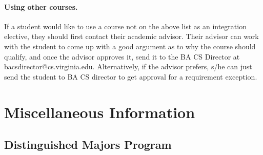 \documentclass[10pt,letter]{book}
\makeatletter
\newenvironment{numlist}{
\begin{enumerate}
\setlength{\itemsep}{0pt}
\setlength{\parskip}{0pt}}
{\end{enumerate}}
\newcommand{\bacsdirectoremail}{bacsdirector@cs.virginia.edu}
\newcommand{\mysection}[1]{\section{#1}\renewcommand{\rightmark}{#1}}
\makeatother
\begin{document}
\paragraph{Using other courses.}  If a student would like to use a
course not on the above list as an integration elective, they should
first contact their academic advisor.  Their advisor can work with the
student to come up with a good argument as to why the course should
qualify, and once the advisor approves it, send it to the BA CS
Director at \bacsdirectoremail.  Alternatively, if the advisor
prefers, s/he can just send the student to BA CS director to get
approval for a requirement exception.

\mysection{Miscellaneous Information}


%
%
%
%
%
%


\subsection{Distinguished Majors Program}
\end{document}
